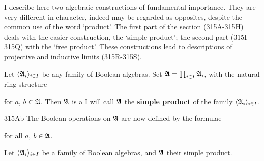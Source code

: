 
\def\chaptername{Boolean algebras}
\def\sectionname{Products and free products}


I describe here two algebraic constructions of fundamental importance.
They are very different in character, indeed may be regarded as
opposites, despite the common use of the word
`product'.   The first part of the section
(315A-315H) %
deals with the easier construction, the `simple product';
the second part (315I-315Q) %
with the `free product'.
These constructions lead to descriptions of projective and inductive
limits (315R-315S).

 Let
$\langle\frak A_i\rangle_{i\in I}$ be any family of Boolean algebras.
Set $\frak A=\prod_{i\in I}\frak A_i$, with the natural ring structure



\noindent for $a$, $b\in\frak A$.   Then $\frak A$ is a
I will call $\frak A$ the {\bf simple product} of the family
$\langle\frak A_i\rangle_{i\in I}$.



\spheader 315Ab The Boolean operations on $\frak A$ are now defined by
the formulae


\noindent for all $a$, $b\in\frak A$.


 Let $\langle\frak A_i\rangle_{i\in I}$ be a
family of Boolean algebras, and $\frak A$ their simple product.

